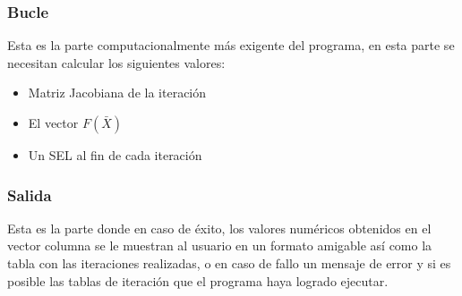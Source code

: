 ﻿\documentclass[11pt]{article}
\begin{document}
\subsubsection{Bucle}
Esta es la parte computacionalmente más exigente del programa, en esta parte se necesitan calcular los siguientes valores:
\begin{itemize}
  \item Matriz Jacobiana de la iteración
  \item El vector $F(\bar{X})$
  \item Un SEL al fin de cada iteración
\end{itemize}
\subsubsection{Salida}
Esta es la parte donde en caso de éxito, los valores numéricos obtenidos en el vector columna se le muestran al usuario en un formato amigable así como la tabla con las iteraciones realizadas, o en caso de fallo un mensaje de error y si es posible las tablas de iteración que el programa haya logrado ejecutar.  
\clearpage

\nocite{*}

\end{document}
